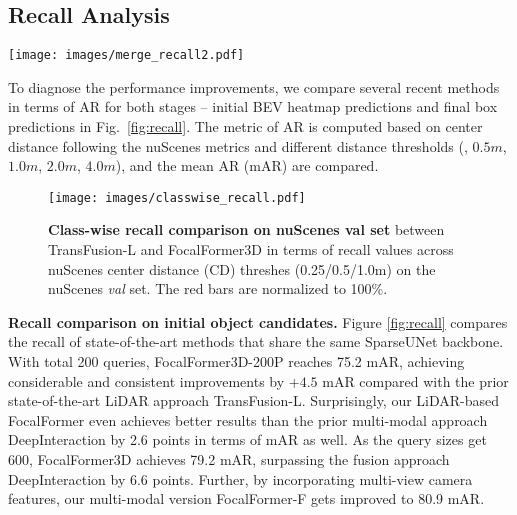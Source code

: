 \documentclass[10pt,twocolumn,letterpaper]{article}
\begin{document}
\subsection{Recall Analysis}

\begin{figure*}[t]
	\begin{center}
		\texttt{[image: images/merge\_recall2.pdf]}
	\end{center}
	\caption{Average recall comparisons between initial object predictions and final object prediction centers on the nuScenes \textit{val} set. The subfigures are shown over center distance thresholds (\%) following nuScenes detection metrics. }
	\label{fig:recall}
\end{figure*}

To diagnose the performance improvements, we compare several recent methods in terms of AR for both stages -- initial BEV heatmap predictions and final box predictions in Fig.~\ref{fig:recall}. The metric of AR is computed based on center distance following the nuScenes metrics and different distance thresholds (\eg, $0.5m$, $1.0m$, $2.0m$, $4.0m$), and the mean AR (mAR) are compared. 

\begin{figure}[t]
	\begin{center}
		\texttt{[image: images/classwise\_recall.pdf]}
	\end{center}
	\caption{\textbf{Class-wise recall comparison on nuScenes val set} between TransFusion-L and FocalFormer3D in terms of recall values across nuScenes center distance (CD) threshes (0.25/0.5/1.0m) on the nuScenes \textit{val} set. The red bars are normalized to 100\%.}
	\label{fig:classwise recall}
\end{figure}

\vspace{2mm}
\noindent\textbf{Recall comparison on initial object candidates.}
Figure \ref{fig:recall} compares the recall of state-of-the-art methods that share the same SparseUNet backbone. With total 200 queries, FocalFormer3D-200P reaches 75.2 mAR, achieving considerable and consistent improvements by $+4.5$ mAR compared with the prior state-of-the-art LiDAR approach TransFusion-L. Surprisingly, our LiDAR-based FocalFormer even achieves better results than the prior multi-modal approach DeepInteraction by 2.6 points in terms of mAR as well. As the query sizes get 600, FocalFormer3D achieves 79.2 mAR, surpassing the fusion approach DeepInteraction by 6.6 points. Further, by incorporating multi-view camera features, our multi-modal version FocalFormer-F gets improved to 80.9 mAR.
\end{document}
